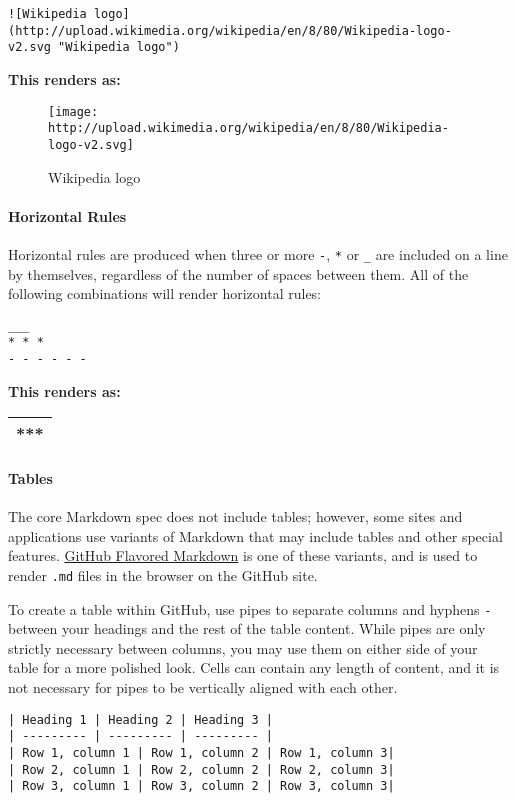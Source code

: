 \documentclass{article}
\begin{document}
\texttt{!{[}Wikipedia\ logo{]}(http://upload.wikimedia.org/wikipedia/en/8/80/Wikipedia-logo-v2.svg\ "Wikipedia\ logo")}

\textbf{This renders as:}

\begin{figure}[htbp]
\centering
\texttt{[image: http://upload.wikimedia.org/wikipedia/en/8/80/Wikipedia-logo-v2.svg]}
\caption{Wikipedia logo}
\end{figure}

    \paragraph{Horizontal Rules}\label{horizontal-rules}

Horizontal rules are produced when three or more \texttt{-}, \texttt{*}
or \texttt{\_} are included on a line by themselves, regardless of the
number of spaces between them. All of the following combinations will
render horizontal rules:

\begin{verbatim}
___
* * *
- - - - - -
\end{verbatim}

\textbf{This renders as:}

\begin{longtable}[]{@{}l@{}}
\toprule
***\tabularnewline
\bottomrule
\end{longtable}

    \paragraph{Tables}\label{tables}

The core Markdown spec does not include tables; however, some sites and
applications use variants of Markdown that may include tables and other
special features.
\href{https://help.github.com/articles/github-flavored-markdown/}{GitHub
Flavored Markdown} is one of these variants, and is used to render
\texttt{.md} files in the browser on the GitHub site.

To create a table within GitHub, use pipes \texttt{\textbar{}} to
separate columns and hyphens \texttt{-} between your headings and the
rest of the table content. While pipes are only strictly necessary
between columns, you may use them on either side of your table for a
more polished look. Cells can contain any length of content, and it is
not necessary for pipes to be vertically aligned with each other.

\begin{verbatim}
| Heading 1 | Heading 2 | Heading 3 |
| --------- | --------- | --------- |
| Row 1, column 1 | Row 1, column 2 | Row 1, column 3|
| Row 2, column 1 | Row 2, column 2 | Row 2, column 3|
| Row 3, column 1 | Row 3, column 2 | Row 3, column 3|
\end{verbatim}
\end{document}
